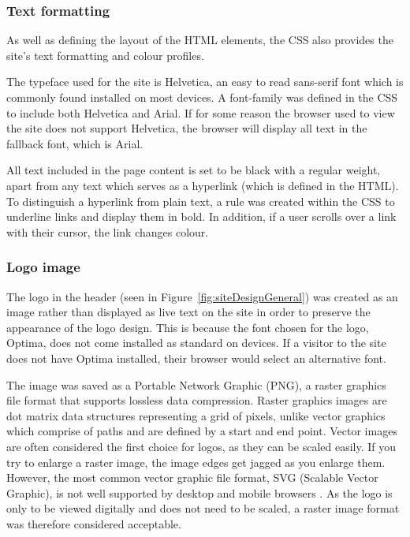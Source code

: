 \documentclass[11pt]{article}
\begin{document}
\subsubsection{Text formatting}

As well as defining the layout of the HTML elements, the CSS also provides the site's text formatting and colour profiles.

The typeface used for the site is Helvetica, an easy to read sans-serif font which is commonly found installed on most devices. A font-family was defined in the CSS to include both Helvetica and Arial. If for some reason the browser used to view the site does not support Helvetica, the browser will display all text in the fallback font, which is Arial.

All text included in the page content is set to be black with a regular weight, apart from any text which serves as a hyperlink (which is defined in the HTML). To distinguish a hyperlink from plain text, a rule was created within the CSS to underline links and display them in bold. In addition, if a user scrolls over a link with their cursor, the link changes colour.

\subsubsection{Logo image}
The logo in the header (seen in Figure~\ref{fig:siteDesignGeneral}) was created as an image rather than displayed as live text on the site in order to preserve the appearance of the logo design. This is because the font chosen for the logo, Optima, does not come installed as standard on devices. If a visitor to the site does not have Optima installed, their browser would select an alternative font.

The image was saved as a Portable Network Graphic (PNG), a raster graphics file format that supports lossless data compression. Raster graphics images are dot matrix data structures representing a grid of pixels, unlike vector graphics which comprise of paths and are defined by a start and end point. Vector images are often considered the first choice for logos, as they can be scaled easily. If you try to enlarge a raster image, the image edges get jagged as you enlarge them. However, the most common vector graphic file format, SVG (Scalable Vector Graphic), is not well supported by desktop and mobile browsers \cite{SVG}. As the logo is only to be viewed digitally and does not need to be scaled, a raster image format was therefore considered acceptable.
\end{document}
